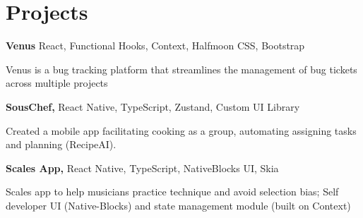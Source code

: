 
\newenvironment{twocolentry_proj}[2][]{
    \onecolentry
    \def\secondColumn{#2}
    \setcolumnwidth{\fill, 7 cm}
    \begin{paracol}{2}
}{
    \switchcolumn \raggedleft \secondColumn
    \end{paracol}
    \endonecolentry
} %

\vspace{5 pt - 0.5 cm}
\section{Projects}
\begin{twocolentry_proj}{
    \mbox{}%
}
\fontsize{11 pt}{11 pt}\textbf{Venus} React, Functional Hooks, Context, Halfmoon CSS, Bootstrap
\end{twocolentry_proj}

\begin{onecolentry}
    \begin{highlights}
        \item Venus is a bug tracking platform that streamlines the management of bug tickets across multiple projects
    \end{highlights}
\end{onecolentry}

\vspace{0.10 cm}
\begin{twocolentry_proj}{
    \mbox{}%
}
\fontsize{11 pt}{11 pt}\textbf{SousChef,} React Native, TypeScript, Zustand, Custom UI Library  
\end{twocolentry_proj}
\begin{onecolentry}
    \begin{highlights}
        \item Created a mobile app facilitating cooking as a group, automating assigning tasks and planning (RecipeAI).
    \end{highlights}
\end{onecolentry}

\vspace{0.10 cm}
\begin{twocolentry_proj}{
    \mbox{}%
}
\fontsize{11 pt}{11 pt}\textbf{Scales App,} React Native, TypeScript, NativeBlocks UI, Skia
\end{twocolentry_proj}
\begin{onecolentry}
    \begin{highlights}
        \item Scales app to help musicians practice technique and avoid selection bias; Self developer UI (Native-Blocks) and state management module (built on Context)
    \end{highlights}
\end{onecolentry}